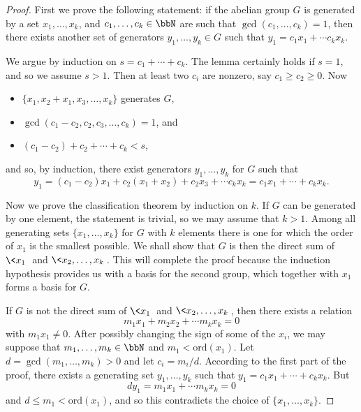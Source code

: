 \begin{proof}
    First we prove the following statement: if the abelian group $G$ is generated by a set $x_1,\ldots,x_k$, and $c_1,\ldots,c_k\in\bbN$ are such that $\gcd(c_1,\ldots,c_k)=1$, then there exists another set of generators $y_1,\ldots,y_k\in G$ such that $y_1=c_1x_1+\cdots c_kx_k$.

    We argue by induction on $s=c_1+\cdots+c_k$. The lemma certainly holds if $s=1$, and so we assume $s>1$. Then at least two $c_i$ are nonzero, say $c_1\geq c_2\geq 0$. Now
    \begin{itemize}
        \item $\{x_1,x_2+x_1,x_3,\ldots,x_k\}$ generates $G$,
        \item $\gcd(c_1-c_2,c_2,c_3,\ldots,c_k)=1$, and
        \item $(c_1-c_2)+c_2+\cdots+c_k<s$,
    \end{itemize}
    and so, by induction, there exist generators $y_1,\ldots, y_k$ for $G$ such that
    \[y_1=(c_1-c_2)x_1+c_2(x_1+x_2)+c_2x_3+\cdots c_kx_k=c_1x_1+\cdots +c_kx_k.\]

    Now we prove the classification theorem by induction on $k$. If $G$ can be generated by one element, the statement is trivial, so we may assume that $k>1$. Among all generating sets $\{x_1,\ldots,x_k\}$ for $G$ with $k$ elements there is one for which the order of $x_1$ is the smallest possible. We shall show that $G$ is then the direct sum of $\<x_1\>$ and $\<x_2,\ldots,x_k\>$. This will complete the proof because the induction hypothesis provides us with a basis for the second group, which together with $x_1$ forms a basis for $G$.

    If $G$ is not the direct sum of $\<x_1\>$ and $\<x_2,\ldots,x_k\>$, then there exists a relation
    \[m_1x_1+m_2x_2+\cdots m_kx_k=0\]
    with $m_1x_1\neq 0$. After possibly changing the sign of some of the $x_i$, we may suppose that $m_1,\ldots,m_k\in\bbN$ and $m_1<\mathrm{ord}(x_1)$. Let $d=\gcd(m_1,\ldots,m_k)>0$ and let $c_i=m_i/d$. According to the first part of the proof, there exists a generating set $y_1,\ldots,y_k$ such that $y_1=c_1x_1+\cdots+c_kx_k$. But 
    \[dy_1=m_1x_1+\cdots m_kx_k=0\]
    and $d\leq m_1<\mathrm{ord}(x_1)$, and so this contradicts the choice of $\{x_1,\ldots,x_k\}$.
\end{proof}

